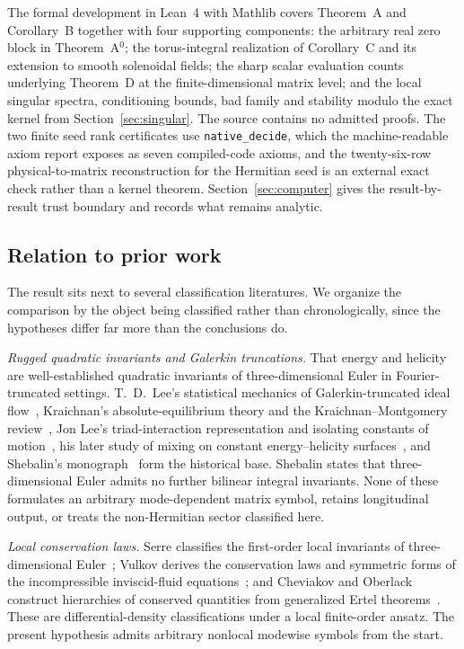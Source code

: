 \documentclass[11pt]{article}
\theoremstyle{definition}
\theoremstyle{remark}
\theoremstyle{plain}
\begin{document}
The formal development in Lean~4 with Mathlib covers Theorem~A and
Corollary~B together with four supporting components: the arbitrary real
zero block in Theorem~A$^{0}$; the torus-integral realization of
Corollary~C and its extension to smooth solenoidal fields; the sharp scalar
evaluation counts underlying Theorem~D at
the finite-dimensional matrix level; and the local singular spectra,
conditioning bounds, bad family and stability modulo the exact kernel from
Section~\ref{sec:singular}. The source contains no admitted proofs. The two
finite seed rank certificates use \texttt{native\_decide}, which the
machine-readable axiom report exposes as seven compiled-code axioms, and the
twenty-six-row physical-to-matrix reconstruction for the Hermitian seed is an
external exact check rather than a kernel theorem. Section~\ref{sec:computer}
gives the result-by-result trust boundary and records what remains analytic.

\subsection{Relation to prior work}
\label{subsec:prior}

The result sits next to several classification literatures. We organize the
comparison by the object being classified rather than chronologically, since
the hypotheses differ far more than the conclusions do.

\emph{Rugged quadratic invariants and Galerkin truncations.} That energy and
helicity are well-established quadratic invariants of three-dimensional Euler
in Fourier-truncated settings. T.~D.~Lee's statistical mechanics of
Galerkin-truncated ideal flow~\cite{TDLee1952}, Kraichnan's
absolute-equilibrium theory and the Kraichnan--Montgomery
review~\cite{KraichnanMontgomery1980}, Jon Lee's triad-interaction
representation and isolating constants of motion~\cite{JLee1975a,JLee1975b},
his later study of mixing on constant energy--helicity
surfaces~\cite{JLee1982}, and Shebalin's monograph~\cite{Shebalin2002} form
the historical base. Shebalin states that three-dimensional Euler admits no
further bilinear integral invariants. None of these formulates an arbitrary
mode-dependent matrix symbol, retains longitudinal output, or treats the
non-Hermitian sector classified here.

\emph{Local conservation laws.} Serre classifies the first-order local
invariants of three-dimensional Euler~\cite{Serre1984}; Vulkov derives the
conservation laws and symmetric forms of the incompressible inviscid-fluid
equations~\cite{Vulkov1999}; and Cheviakov and Oberlack construct hierarchies
of conserved quantities from generalized Ertel
theorems~\cite{CheviakovOberlack2014}. These are differential-density
classifications under a local finite-order ansatz. The present hypothesis
admits arbitrary nonlocal modewise symbols from the start.
\end{document}
